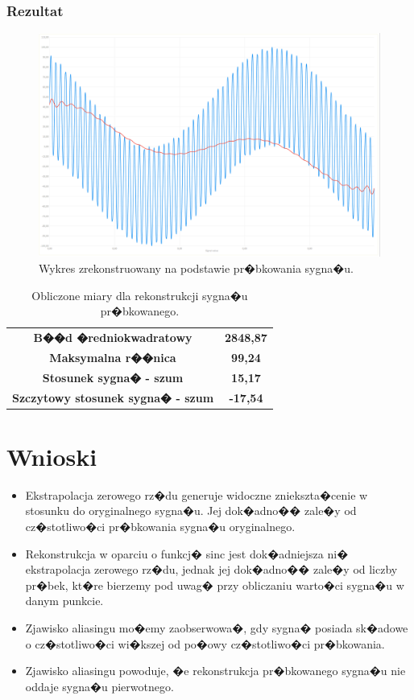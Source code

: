 \documentclass[12pt]{article}
\begin{document}
\subsubsection{Rezultat}

\begin{figure}[h!]
\includegraphics[scale=0.35]{w6.png}
\caption{Wykres zrekonstruowany na podstawie pr�bkowania sygna�u.}
\end{figure}


\begin{table}[h!]
\centering
\caption{Obliczone miary dla rekonstrukcji sygna�u pr�bkowanego.}
\begin{tabular}{c c}
\textbf{B��d �redniokwadratowy} & \textbf{2848,87} \\
\textbf{Maksymalna r��nica} & \textbf{99,24} \\
\textbf{Stosunek sygna� - szum} & \textbf{15,17} \\
\textbf{Szczytowy stosunek sygna� - szum} & \textbf{-17,54} \\
\end{tabular}
\end{table}
\newpage

\section{Wnioski}
\begin{itemize}
\item Ekstrapolacja zerowego rz�du generuje widoczne zniekszta�cenie w stosunku do oryginalnego sygna�u. Jej dok�adno�� zale�y od cz�stotliwo�ci pr�bkowania sygna�u oryginalnego.
\item Rekonstrukcja w oparciu o funkcj� sinc jest dok�adniejsza ni� ekstrapolacja zerowego rz�du, jednak jej dok�adno�� zale�y od liczby pr�bek, kt�re bierzemy pod uwag� przy obliczaniu warto�ci sygna�u w danym punkcie.
\item Zjawisko aliasingu mo�emy zaobserwowa�, gdy sygna� posiada sk�adowe o cz�stotliwo�ci wi�kszej od po�owy cz�stotliwo�ci pr�bkowania.
\item Zjawisko aliasingu powoduje, �e rekonstrukcja pr�bkowanego sygna�u nie oddaje sygna�u pierwotnego.
\end{itemize}
\end{document}

